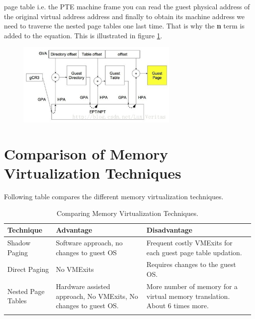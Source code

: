 page table i.e. the PTE machine frame you can read the guest physical address of the original
virtual address address and finally to obtain its machine address we need to traverse the nested
page tables one last time. That is why the \textbf{n} term is added to the equation.
This is illustrated in figure \ref{fig:npt}.\\
\begin{figure}[tbp]
  \begin{center}
    \includegraphics[width=0.7\textwidth]{images/npt}
    \label{fig:npt}
     \end{center}
\end{figure}

\section{Comparison of Memory Virtualization Techniques}
Following table compares the different memory virtualization techniques.
\begin{table}[!htbp]
  \begin{center}
    \caption{Comparing Memory Virtualization Techniques.}
    \label{tab:compare}
    \begin{tabular}{p{3cm} p{5cm} p{5cm}}
      \toprule 
      Technique & Advantage & Disadvantage \\
      \midrule
      Shadow Paging & Software approach, no changes to guest OS  & Frequent costly VMExits for each guest page table updation.\\
      \midrule
      Direct Paging &  No VMExits & Requires changes to the guest OS.\\
      \midrule
      Nested Page Tables & Hardware assisted approach, No VMExits, No changes to guest OS. & More number of memory for a virtual memory translation. About 6 times more. \\
      \bottomrule \\
    \end{tabular}
  \end{center}
\end{table}
